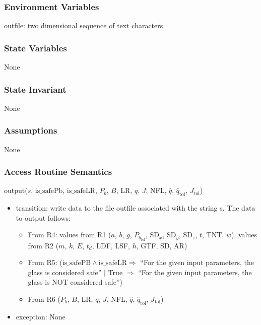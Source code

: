 \documentclass[12pt, titlepage]{article}
\begin{document}
\subsubsection {Environment Variables}

outfile: two dimensional sequence of text characters

\subsubsection {State Variables}

None

\subsubsection {State Invariant}

None

\subsubsection {Assumptions}

None

\subsubsection {Access Routine Semantics}

\noindent output($s$, $\mbox{is\_safePb}$, $\mbox{is\_safeLR}$, $P_b$, $B$, 
LR, $q$, $J$, NFL, $\hat{q}$, $\hat{q}_{\text{tol}}$, $J_{\text{tol}}$)

\begin{itemize}
\item transition: write data to the file outfile associated with the string s.
  The data to output follows:
\begin{itemize}
\item From R4: values from R1 ($a$, $b$, $g$, $P_{b_\text{tol}}$, $\mbox{SD}_x$,
  $\mbox{SD}_y$, $\mbox{SD}_z$, $t$, TNT, $w$), values from R2 ($m$, $k$, $E$,
  $t_d$, LDF, LSF, $h$, GTF, SD, AR)
\item From R5: ($\mbox{is\_safePB} \wedge \mbox{is\_safeLR}
  \Rightarrow$ ``For the given input parameters, the glass is considered safe''
 $ |$ True $\Rightarrow$ ``For the given input parameters, the glass is NOT
 considered safe'') 
\item From R6 ($P_b$, $B$, LR, $q$, $J$, NFL, $\hat{q}$, $\hat{q}_{\text{tol}}$, $J_{\text{tol}}$)
\end{itemize}
\item exception: None
\end{itemize}
\end{document}
